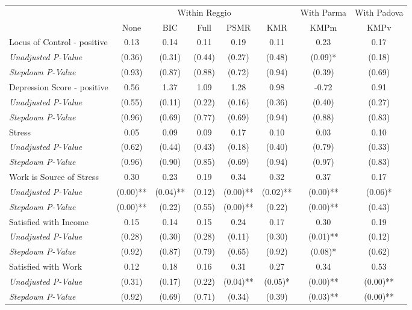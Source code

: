 \begin{tabular}{l c c c c c c c}
\toprule
& \multicolumn{5}{c}{Within Reggio} & With Parma & With Padova \\\cmidrule(lr){2-6} \cmidrule(lr){7-7} \cmidrule(lr){8-8}
 & None & BIC & Full & PSMR & KMR & KMPm & KMPv \\
\midrule
Locus of Control - positive & 0.13 & 0.14 & 0.11 & 0.19 & 0.11 & 0.23 & 0.17 \\
\quad \textit{Unadjusted P-Value} & (0.36) & (0.31) & (0.44) & (0.27) & (0.48) & (0.09)* & (0.18) \\
\quad \textit{Stepdown P-Value} & (0.93) & (0.87) & (0.88) & (0.72) & (0.94) & (0.39) & (0.69) \\
Depression Score - positive & 0.56 & 1.37 & 1.09 & 1.28 & 0.98 & -0.72 & 0.91 \\
\quad \textit{Unadjusted P-Value} & (0.55) & (0.11) & (0.22) & (0.16) & (0.36) & (0.40) & (0.27) \\
\quad \textit{Stepdown P-Value} & (0.96) & (0.69) & (0.77) & (0.69) & (0.94) & (0.88) & (0.83) \\
Stress & 0.05 & 0.09 & 0.09 & 0.17 & 0.10 & 0.03 & 0.10 \\
\quad \textit{Unadjusted P-Value} & (0.62) & (0.44) & (0.43) & (0.18) & (0.40) & (0.79) & (0.33) \\
\quad \textit{Stepdown P-Value} & (0.96) & (0.90) & (0.85) & (0.69) & (0.94) & (0.97) & (0.83) \\
Work is Source of Stress & 0.30 & 0.23 & 0.19 & 0.34 & 0.32 & 0.37 & 0.17 \\
\quad \textit{Unadjusted P-Value} & (0.00)** & (0.04)** & (0.12) & (0.00)** & (0.02)** & (0.00)** & (0.06)* \\
\quad \textit{Stepdown P-Value} & (0.00)** & (0.22) & (0.55) & (0.00)** & (0.22) & (0.00)** & (0.43) \\
Satisfied with Income & 0.15 & 0.14 & 0.15 & 0.24 & 0.17 & 0.30 & 0.19 \\
\quad \textit{Unadjusted P-Value} & (0.28) & (0.30) & (0.28) & (0.11) & (0.30) & (0.01)** & (0.12) \\
\quad \textit{Stepdown P-Value} & (0.92) & (0.87) & (0.79) & (0.65) & (0.92) & (0.08)* & (0.62) \\
Satisfied with Work & 0.12 & 0.18 & 0.16 & 0.31 & 0.27 & 0.34 & 0.53 \\
\quad \textit{Unadjusted P-Value} & (0.31) & (0.17) & (0.22) & (0.04)** & (0.05)* & (0.00)** & (0.00)** \\
\quad \textit{Stepdown P-Value} & (0.92) & (0.69) & (0.71) & (0.34) & (0.39) & (0.03)** & (0.00)** \\

\end{tabular}
